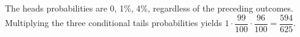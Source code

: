 The heads probabilities are 0, 1\%, 4\%, regardless of the preceding outcomes. Multiplying the three conditional tails probabilities yields $ 1\cdot\dfrac{99}{100}\cdot\dfrac{96}{100}=\boxed{\dfrac{594}{625}}$.
